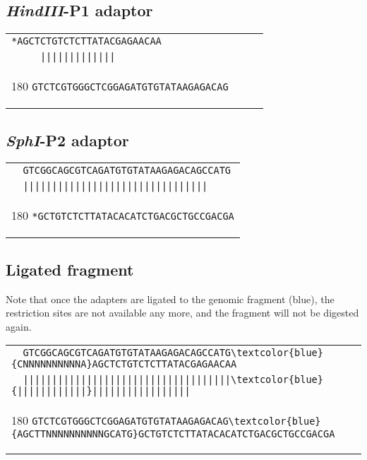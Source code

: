 \documentclass[a4paper,12pt]{article}
\begin{document}
\begin{flushleft}
\subsection*{\emph{HindIII}-P1 adaptor}
\begin{tabular}{l}
\verb+*AGCTCTGTCTCTTATACGAGAACAA+\\
\verb+     |||||||||||||+\\[-8pt]
   \begin{turn}{180}
   \verb+GTCTCGTGGGCTCGGAGATGTGTATAAGAGACAG     +
   \end{turn}
\\
\end{tabular}
\vspace*{0.3cm}

\subsection*{\emph{SphI}-P2 adaptor}

\begin{tabular}{l}
\verb+  GTCGGCAGCGTCAGATGTGTATAAGAGACAGCCATG+\\
\verb+  ||||||||||||||||||||||||||||||||+\\[-8pt]
   \begin{turn}{180}
   \verb+*GCTGTCTCTTATACACATCTGACGCTGCCGACGA+
   \end{turn}
\\
\end{tabular}
\vspace*{0.3cm}

\subsection*{Ligated fragment}
Note that once the adapters are ligated to the genomic fragment (blue), the restriction sites are not available any more, and the fragment will not be digested again.

\begin{tabular}{l}
\Verb+  GTCGGCAGCGTCAGATGTGTATAAGAGACAGCCATG\textcolor{blue}{CNNNNNNNNNNA}AGCTCTGTCTCTTATACGAGAACAA+\\[-6pt]
\Verb+  ||||||||||||||||||||||||||||||||||||\textcolor{blue}{||||||||||||}|||||||||||||||||+\\[-10pt]
   \begin{turn}{180}
   \Verb+GTCTCGTGGGCTCGGAGATGTGTATAAGAGACAG\textcolor{blue}{AGCTTNNNNNNNNNNGCATG}GCTGTCTCTTATACACATCTGACGCTGCCGACGA+
   \end{turn}
\\
\end{tabular}
\vspace*{0.3cm}


\end{flushleft}
\end{document}
